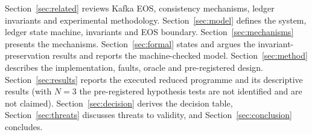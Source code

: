 Section~\ref{sec:related} reviews Kafka EOS, consistency mechanisms, ledger invariants and
experimental methodology. Section~\ref{sec:model} defines the system, ledger state machine,
invariants and EOS boundary. Section~\ref{sec:mechanisms} presents the mechanisms.
Section~\ref{sec:formal} states and argues the invariant-preservation results and reports the
machine-checked model. Section~\ref{sec:method} describes the implementation, faults, oracle and
pre-registered design. Section~\ref{sec:results} reports the executed reduced programme and its
descriptive results (with $N=3$ the pre-registered hypothesis tests are not identified and are not
claimed).
Section~\ref{sec:decision} derives the decision table, Section~\ref{sec:threats} discusses
threats to validity, and Section~\ref{sec:conclusion} concludes.
